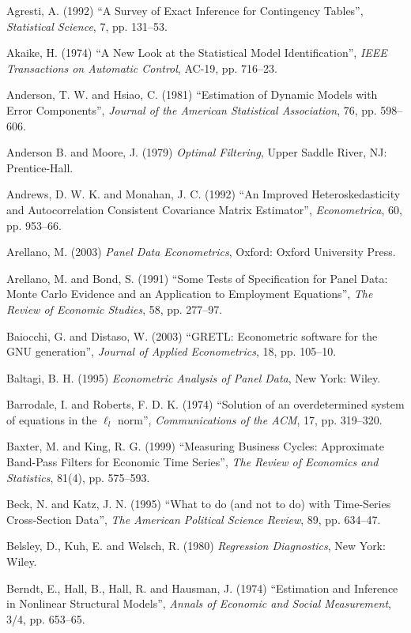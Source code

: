\begin{thebibliography}

  Agresti, A. (1992) ``A Survey of Exact Inference for Contingency
  Tables'', \emph{Statistical Science}, 7, pp. 131--53.

  Akaike, H. (1974) ``A New Look at the Statistical Model
  Identification'', \emph{IEEE Transactions on Automatic Control},
  AC-19, pp. 716--23.

  Anderson, T. W. and Hsiao, C. (1981) ``Estimation of Dynamic Models
  with Error Components'', \emph{Journal of the American Statistical
    Association}, 76, pp. 598--606.

  Anderson B. and Moore, J. (1979) \emph{Optimal Filtering}, Upper
  Saddle River, NJ: Prentice-Hall.


  Andrews, D. W. K. and Monahan, J. C. (1992) ``An Improved
  Heteroskedasticity and Autocorrelation Consistent Covariance Matrix
  Estimator'', \emph{Econometrica}, 60, pp. 953--66.

  Arellano, M. (2003) \emph{Panel Data Econometrics}, Oxford: Oxford
  University Press.

  Arellano, M. and Bond, S. (1991) ``Some Tests of Specification for
  Panel Data: Monte Carlo Evidence and an Application to Employment
  Equations'', \emph{The Review of Economic Studies}, 58, pp.
  277--97.

  Baiocchi, G. and Distaso, W. (2003) ``GRETL: Econometric software
  for the GNU generation'', \emph{Journal of Applied Econometrics},
  18, pp. 105--10.
  
  Baltagi, B. H. (1995) \emph{Econometric Analysis of Panel Data}, New
  York: Wiley.

  Barrodale, I. and Roberts, F. D. K. (1974) ``Solution of an
  overdetermined system of equations in the $\ell_l$ norm'',
  \emph{Communications of the ACM}, 17, pp. 319--320.

  Baxter, M. and King, R. G. (1999) ``Measuring Business Cycles:
  Approximate Band-Pass Filters for Economic Time Series'', \emph{The Review
  of Economics and Statistics}, 81(4), pp. 575--593.

  Beck, N. and Katz, J. N. (1995) ``What to do (and not to do) with
  Time-Series Cross-Section Data'', \emph{The American Political
    Science Review}, 89, pp. 634--47.

  Belsley, D., Kuh, E. and Welsch, R. (1980) \emph{Regression
    Diagnostics}, New York: Wiley.

  Berndt, E., Hall, B., Hall, R. and Hausman, J. (1974) ``Estimation
  and Inference in Nonlinear Structural Models'', \emph{Annals of
    Economic and Social Measurement}, 3/4, pp. 653--65.


\end{thebibliography}
